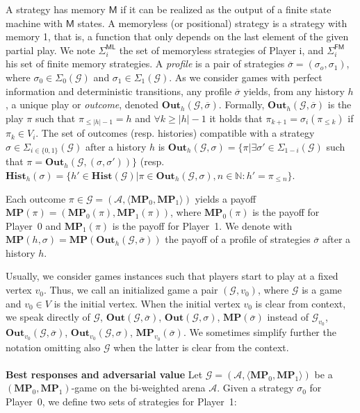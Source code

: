 A strategy has memory $\mathsf{M}$ if it can be realized as the output of a finite state machine with $\mathsf{M}$ states. A memoryless (or positional) strategy is a strategy with memory 1, that is, a function that only depends on the last element of the given partial play. We note $\Sigma^{\mathsf{ML}}_i$ the set of memoryless strategies of Player i, and $\Sigma^{\mathsf{FM}}_i$ his set of finite memory strategies. A \textit{profile} is a pair of strategies $\overline{\sigma} = (\sigma_o, \sigma_1)$, where $\sigma_0 \in \Sigma_0(\mathcal{G})$ and $\sigma_1 \in \Sigma_1(\mathcal{G})$. As we consider games with perfect information and deterministic transitions, any profile $\overline{\sigma}$ yields, from any history $h$, a unique play or \textit{outcome}, denoted $\mathbf{Out}_h(\mathcal{G}, \overline{\sigma})$. Formally, $\mathbf{Out}_h(\mathcal{G}, \overline{\sigma})$ is the play $\pi$ such that $\pi_{\leqslant|h|-1} = h$ and $\forall k \geqslant |h|-1$ it holds that $\pi_{k+1}=\sigma_i(\pi_{\leqslant k})$ if $\pi_k \in V_i$. The set of outcomes (resp. histories) compatible with a strategy $\sigma \in \Sigma_{i\in\{0,1\}}(\mathcal{G})$ after a history $h$ is $\mathbf{Out}_h(\mathcal{G}, \sigma) = \{ \pi | \exists \sigma'\in \Sigma_{1-i}(\mathcal{G}) $ such that $\pi = \mathbf{Out}_h(\mathcal{G}, (\sigma,\sigma'))\}$ (resp. $\mathbf{Hist}_h(\sigma) = \{h' \in \mathbf{Hist}(\mathcal{G}) | \pi \in \mathbf{Out}_h(\mathcal{G}, \sigma), n \in \mathbb{N}:h'= \pi_{\leqslant n}\}$.

Each outcome $\pi \in \mathcal{G} = (\mathcal{A},\langle \mathbf{MP}_0, \mathbf{MP}_1\rangle)$ yields a payoff $\mathbf{MP}(\pi)=(\mathbf{MP}_0(\pi),\mathbf{MP}_1(\pi))$, where $\mathbf{MP}_0(\pi)$ is the payoff for Player~0 and $\mathbf{MP}_1(\pi)$ is the payoff for Player~1. We denote with $\mathbf{MP}(h, \sigma) = \mathbf{MP}(\mathbf{Out}_h(\mathcal{G}, \overline{\sigma}))$ the payoff of a profile of strategies $\overline{\sigma}$ after a history $h$.

Usually, we consider games instances such that players start to play at a fixed vertex $v_0$. Thus, we call an initialized game a pair $(\mathcal{G}, v_0)$, where $\mathcal{G}$ is a game and $v_0 \in V$ is the initial vertex. When the initial vertex $v_0$ is clear from context, we speak directly of $\mathcal{G}$, $\mathbf{Out}(\mathcal{G}, \overline{\sigma})$, $\mathbf{Out}(\mathcal{G},\sigma)$, $\mathbf{MP}(\overline{\sigma})$ instead of $\mathcal{G}_{v_0}$, $\mathbf{Out}_{v_0}(\mathcal{G}, \overline{\sigma})$, $\mathbf{Out}_{v_0}(\mathcal{G},\sigma)$, $\mathbf{MP}_{v_0}(\overline{\sigma})$. We sometimes simplify further the notation omitting also $\mathcal{G}$ when the latter is clear from the context.
\\
\\
\noindent\textbf{Best responses and adversarial value} Let $\mathcal{G} = (\mathcal{A},\langle \mathbf{MP}_0, \mathbf{MP}_1\rangle)$ be a $(\mathbf{MP}_0, \mathbf{MP}_1)$-game on the bi-weighted arena $\mathcal{A}$. Given a strategy $\sigma_0$ for Player~0, we define two sets of strategies for Player~1:
\\

